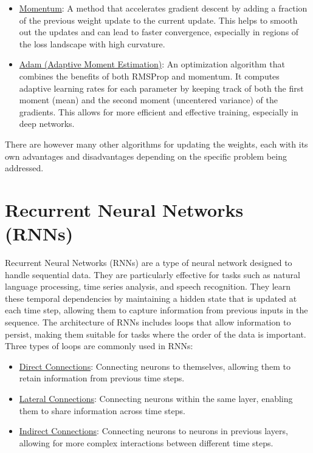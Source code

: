 \begin{itemize}
    \item \ul{Momentum}: A method that accelerates gradient descent by adding a fraction of the previous weight update to the current update. This helps to smooth out the updates and can lead to faster convergence, especially in regions of the loss landscape with high curvature.
    \item \ul{Adam (Adaptive Moment Estimation)}: An optimization algorithm that combines the benefits of both RMSProp and momentum. It computes adaptive learning rates for each parameter by keeping track of both the first moment (mean) and the second moment (uncentered variance) of the gradients. This allows for more efficient and effective training, especially in deep networks.
\end{itemize}

There are however many other algorithms for updating the weights, each with its own advantages and disadvantages depending on the specific problem being addressed.


\section{Recurrent Neural Networks (RNNs)}

Recurrent Neural Networks (RNNs) are a type of neural network designed to handle sequential data. They are particularly effective for tasks such as natural language processing, time series analysis, and speech recognition. They learn these temporal dependencies by maintaining a hidden state that is updated at each time step, allowing them to capture information from previous inputs in the sequence. The architecture of RNNs includes loops that allow information to persist, making them suitable for tasks where the order of the data is important. Three types of loops are commonly used in RNNs:
\begin{itemize}
    \item \ul{Direct Connections}: Connecting neurons to themselves, allowing them to retain information from previous time steps.
    \item \ul{Lateral Connections}: Connecting neurons within the same layer, enabling them to share information across time steps.
    \item \ul{Indirect Connections}: Connecting neurons to neurons in previous layers, allowing for more complex interactions between different time steps.
\end{itemize}



